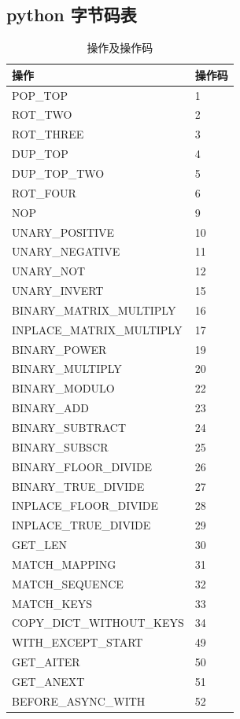 \subsection{python 字节码表}
\begin{table}
    \centering
    \caption{操作及操作码}
      \begin{tabular}{|l|l|}
      \hline
      操作    & 操作码 \\
      \hline
        POP\_TOP & 1 \\ \hline
        ROT\_TWO & 2 \\ \hline
        ROT\_THREE & 3 \\ \hline
        DUP\_TOP & 4 \\ \hline
        DUP\_TOP\_TWO & 5 \\ \hline
        ROT\_FOUR & 6 \\ \hline
        NOP & 9 \\ \hline
        UNARY\_POSITIVE & 10 \\ \hline
        UNARY\_NEGATIVE & 11 \\ \hline
        UNARY\_NOT & 12 \\ \hline
        UNARY\_INVERT & 15 \\ \hline
        BINARY\_MATRIX\_MULTIPLY & 16 \\ \hline
        INPLACE\_MATRIX\_MULTIPLY & 17 \\ \hline
        BINARY\_POWER & 19 \\ \hline
        BINARY\_MULTIPLY & 20 \\ \hline
        BINARY\_MODULO & 22 \\ \hline
        BINARY\_ADD & 23 \\ \hline
        BINARY\_SUBTRACT & 24 \\ \hline
        BINARY\_SUBSCR & 25 \\ \hline
        BINARY\_FLOOR\_DIVIDE & 26 \\ \hline
        BINARY\_TRUE\_DIVIDE & 27 \\ \hline
        INPLACE\_FLOOR\_DIVIDE & 28 \\ \hline
        INPLACE\_TRUE\_DIVIDE & 29 \\ \hline
        GET\_LEN & 30 \\ \hline
        MATCH\_MAPPING & 31 \\ \hline
        MATCH\_SEQUENCE & 32 \\ \hline
        MATCH\_KEYS & 33 \\ \hline
        COPY\_DICT\_WITHOUT\_KEYS & 34 \\ \hline
        WITH\_EXCEPT\_START & 49 \\ \hline
        GET\_AITER & 50 \\ \hline
        GET\_ANEXT & 51 \\ \hline
        BEFORE\_ASYNC\_WITH & 52 \\ \hline
      \end{tabular}
\end{table}

